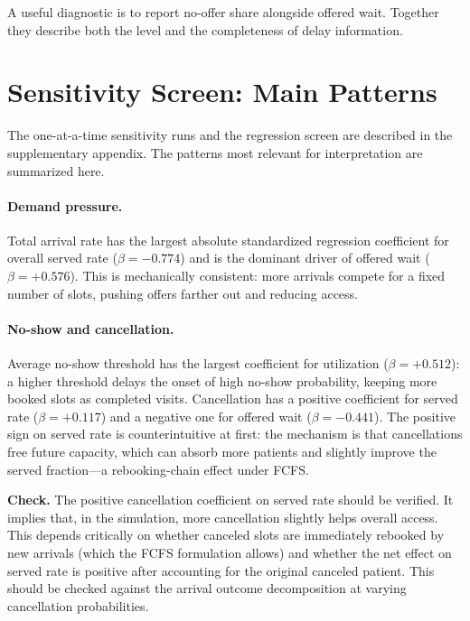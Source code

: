 \documentclass[11pt]{article}
\begin{document}
A useful diagnostic is to report no-offer share alongside offered wait.
Together they describe both the level and the completeness of delay
information.

\section{Sensitivity Screen: Main Patterns}
\label{sec:sensitivity}

The one-at-a-time sensitivity runs and the regression screen are described
in the supplementary appendix. The patterns most relevant for
interpretation are summarized here.

\paragraph{Demand pressure.}
Total arrival rate has the largest absolute standardized regression
coefficient for overall served rate ($\beta = -0.774$) and is the
dominant driver of offered wait ($\beta = +0.576$). This is mechanically
consistent: more arrivals compete for a fixed number of slots, pushing
offers farther out and reducing access.

\paragraph{No-show and cancellation.}
Average no-show threshold has the largest coefficient for utilization
($\beta = +0.512$): a higher threshold delays the onset of high no-show
probability, keeping more booked slots as completed visits. Cancellation
has a positive coefficient for served rate ($\beta = +0.117$) and a
negative one for offered wait ($\beta = -0.441$). The positive sign on
served rate is counterintuitive at first: the mechanism is that
cancellations free future capacity, which can absorb more patients and
slightly improve the served fraction---a rebooking-chain effect under FCFS.

\begin{checkenv}
\textbf{Check.} The positive cancellation coefficient on served rate
should be verified. It implies that, in the simulation, more cancellation
slightly helps overall access. This depends critically on whether
canceled slots are immediately rebooked by new arrivals (which the FCFS
formulation allows) and whether the net effect on served rate is
positive after accounting for the original canceled patient. This should
be checked against the arrival outcome decomposition at varying
cancellation probabilities.
\end{checkenv}
\end{document}
